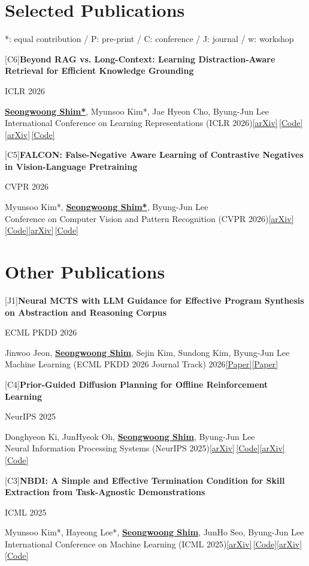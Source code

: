 \documentclass[10.5pt,a4paper]{article}
\newcommand{\entry}[2]{%
  \noindent
  \begin{minipage}[t]{0.765\textwidth}\raggedright\strut #1\strut\end{minipage}%
  \hfill
  \begin{minipage}[t]{0.215\textwidth}\raggedleft\strut{\small\sffamily\color{muted}#2}\strut\end{minipage}%
  \par\vspace{1pt}}
\newcommand{\note}[1]{{\small\color{muted}#1}\par\vspace{9pt}}
\newcommand{\me}[1]{\underline{\textbf{#1}}}
\newcommand{\paperlink}[2]{\href{#2}{\small\color{muted}[#1]}}
\newcommand{\cvpub}[6]{%
  \entry{{\small\color{muted}[#1]}\quad\textbf{#2}}{#5}
  \note{#3\\ #4\ifx\relax#6\relax\else\quad#6\fi}}
\begin{document}
\section*{Selected Publications}
{\small\color{muted}*: equal contribution / P: pre-print / C: conference / J: journal / w: workshop}
\vspace{8pt}

\cvpub{C6}
  {Beyond RAG vs. Long-Context: Learning Distraction-Aware Retrieval for Efficient Knowledge Grounding}
  {\me{Seongwoong Shim*}, Myunsoo Kim*, Jae Hyeon Cho, Byung-Jun Lee}
  {International Conference on Learning Representations (ICLR 2026)}
  {ICLR 2026}
  {\paperlink{arXiv}{https://arxiv.org/abs/2509.21865}\,\paperlink{Code}{https://github.com/ku-dmlab/LDAR}}

\cvpub{C5}
  {FALCON: False-Negative Aware Learning of Contrastive Negatives in Vision-Language Pretraining}
  {Myunsoo Kim*, \me{Seongwoong Shim*}, Byung-Jun Lee}
  {Conference on Computer Vision and Pattern Recognition (CVPR 2026)}
  {CVPR 2026}
  {\paperlink{arXiv}{https://arxiv.org/abs/2505.11192}\,\paperlink{Code}{https://github.com/ku-dmlab/FALCON}}

\section*{Other Publications}

\cvpub{J1}
  {Neural MCTS with LLM Guidance for Effective Program Synthesis on Abstraction and Reasoning Corpus}
  {Jinwoo Jeon, \me{Seongwoong Shim}, Sejin Kim, Sundong Kim, Byung-Jun Lee}
  {Machine Learning (ECML PKDD 2026 Journal Track) 2026}
  {ECML PKDD 2026}
  {\paperlink{Paper}{https://link.springer.com/article/10.1007/s10994-026-07110-1}}

\cvpub{C4}
  {Prior-Guided Diffusion Planning for Offline Reinforcement Learning}
  {Donghyeon Ki, JunHyeok Oh, \me{Seongwoong Shim}, Byung-Jun Lee}
  {Neural Information Processing Systems (NeurIPS 2025)}
  {NeurIPS 2025}
  {\paperlink{arXiv}{https://arxiv.org/abs/2505.10881}\,\paperlink{Code}{https://github.com/ku-dmlab/PG}}

\cvpub{C3}
  {NBDI: A Simple and Effective Termination Condition for Skill Extraction from Task-Agnostic Demonstrations}
  {Myunsoo Kim*, Hayeong Lee*, \me{Seongwoong Shim}, JunHo Seo, Byung-Jun Lee}
  {International Conference on Machine Learning (ICML 2025)}
  {ICML 2025}
  {\paperlink{arXiv}{https://arxiv.org/abs/2501.12668}\,\paperlink{Code}{https://github.com/ku-dmlab/NBDI}}
\end{document}
